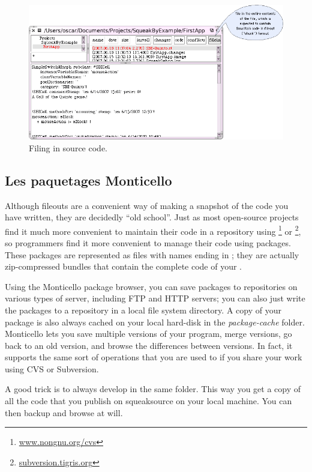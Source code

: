 \documentclass[a4paper,10pt,twoside]{book}
\begin{document}
\begin{figure}[ht]
\centerline {\includegraphics[width=\textwidth]{FileIn}}
\caption{Filing in \squeak source code.
\label{fig:filein}}
\end{figure}

\subsection{Les paquetages Monticello}
Although fileouts are a convenient way of making a snapshot of the code you have written, they are decidedly ``old school''.
Just as most open-source projects find it much more convenient to maintain their code in a repository using \footnote{\url{www.nongnu.org/cvs}} or \footnote{\url{subversion.tigris.org}},
so \squeak programmers find it more convenient to manage their code using  packages. 
These packages are represented as files with names ending in ; they are actually zip-compressed bundles that contain the complete code of your .

Using the Monticello package browser, you can save packages to repositories on various types of server, including FTP and HTTP servers; you can also just write the packages to a repository in a local file system directory.
A copy of your package is also always cached on your local hard-disk in the \emph{package-cache} folder. 
Monticello lets you save multiple versions of your program, merge versions, go back to an old version, and browse the differences between versions. 
In fact, it supports the same sort of operations that you are used to if you share your work using CVS or Subversion.

A good trick is to always develop in the same folder. This way you get a copy of all the code that you publish on squeaksource on your local machine. You can then backup and browse at will.
\end{document}
